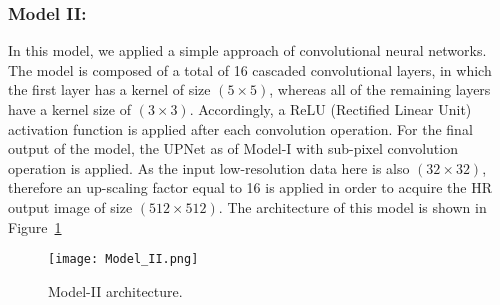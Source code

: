 \subsubsection{Model II:}
In this model, we applied a simple approach of convolutional neural 
networks.
The model is composed of a total of 16 cascaded convolutional layers, in which 
the first layer has a kernel of size \((5\times 5)\), whereas all of the 
remaining layers have a kernel size of \((3\times 3)\).
Accordingly, a ReLU (Rectified Linear Unit) activation function is applied 
after each convolution operation. 
For the final output of the model, the UPNet as of Model-I with sub-pixel 
convolution operation is applied.
As the input low-resolution data here is also \((32\times 32)\), therefore an 
up-scaling factor equal to 16 is applied in order to acquire the HR output 
image of size \((512\times 512)\).
The architecture of this model is shown in Figure~\ref{fig:Model_II}
\begin{figure} [h!]
	\begin{center}
		\texttt{[image: Model\_II.png]}
	\end{center}
	\caption{Model-II architecture.} 
	\label{fig:Model_II}
\end{figure}
\clearpage
